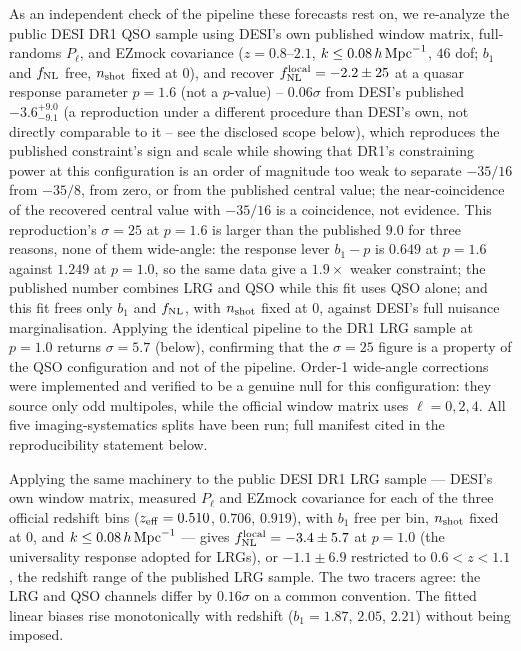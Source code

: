 \documentclass[aps,prd,twocolumn,superscriptaddress,nofootinbib,longbibliography]{revtex4-2}
\newcommand{\fnl}{f_{\rm NL}}
\newcommand{\fnlloc}{f_{\rm NL}^{\rm local}}
\begin{document}
As an independent check of the pipeline these forecasts rest on, we
re-analyze the public DESI DR1 QSO sample using DESI's own published
window matrix, full-randoms $P_\ell$, and EZmock covariance
($z=0.8$--$2.1$, $k\le0.08\,h\,{\rm Mpc}^{-1}$, $46$ dof; $b_1$ and $\fnl$
free, $n_{\rm shot}$ fixed at $0$), and recover $\fnlloc=-2.2\pm25$ at a
quasar response parameter $p=1.6$ (not a $p$-value) -- $0.06\sigma$ from DESI's published $-3.6^{+9.0}_{-9.1}$ (a reproduction under a different procedure than DESI's own, not directly comparable to it -- see the disclosed scope below), which
reproduces the published constraint's sign and scale while showing that
DR1's constraining power at this configuration is an order of magnitude
too weak to separate $-35/16$ from $-35/8$, from zero, or from the
published central value; the near-coincidence of the recovered central
value with $-35/16$ is a coincidence, not evidence. This reproduction's
$\sigma=25$ at $p=1.6$ is larger than the published $9.0$ for three
reasons, none of them wide-angle: the response lever $b_1-p$ is $0.649$ at
$p=1.6$ against $1.249$ at $p=1.0$, so the same data give a $1.9\times$
weaker constraint; the published number combines LRG and QSO while this
fit uses QSO alone; and this fit frees only $b_1$ and $\fnl$, with
$n_{\rm shot}$ fixed at $0$, against DESI's full nuisance marginalisation.
Applying the identical pipeline to the DR1 LRG sample at $p=1.0$ returns
$\sigma=5.7$ (below), confirming that the $\sigma=25$ figure is a property
of the QSO configuration and not of the pipeline. Order-1 wide-angle
corrections were implemented and verified to be a genuine null for this
configuration: they source only odd multipoles, while the official window
matrix uses $\ell=0,2,4$. All five imaging-systematics splits have been
run; full manifest cited in the reproducibility statement below.

Applying the same machinery to the public DESI DR1 LRG sample --- DESI's
own window matrix, measured $P_\ell$ and EZmock covariance for each of the
three official redshift bins ($z_{\rm eff}=0.510$, $0.706$, $0.919$), with
$b_1$ free per bin, $n_{\rm shot}$ fixed at $0$, and
$k\le0.08\,h\,{\rm Mpc}^{-1}$ --- gives $\fnlloc = -3.4\pm5.7$ at $p=1.0$
(the universality response adopted for LRGs), or $-1.1\pm6.9$ restricted
to $0.6<z<1.1$, the redshift range of the published LRG sample. The two
tracers agree: the LRG and QSO channels differ by $0.16\sigma$ on a common
convention. The fitted linear biases rise monotonically with redshift
($b_1=1.87$, $2.05$, $2.21$) without being imposed.
\end{document}
